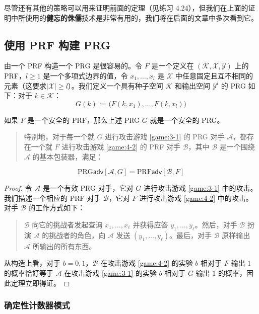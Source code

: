 尽管还有其他的策略可以用来证明前面的定理（见练习 4.24），但我们在上面的证明中所使用的\textbf{健忘的侏儒}技术是非常有用的，我们将在后面的文章中多次看到它。

\subsection{使用 PRF 构建 PRG}\label{subsec:4-4-4}

由一个 PRF 构造一个 PRG 是很容易的。令 $F$ 是一个定义在 $(\mathcal{K},\mathcal{X},\mathcal{Y})$ 上的 PRF，$l\geq1$ 是一个多项式边界的值，令 $x_1,\dots,x_l$ 是 $\mathcal{X}$ 中任意固定且互不相同的元素（这要求$|\mathcal{X}|\geq l$）。我们定义一个具有种子空间 $\mathcal{K}$ 和输出空间 $\mathcal{Y}^l$ 的 PRG 如下：对于 $k\in\mathcal{K}$：
\[
G(k):=
\big(
F(k,x_1),\dots,F(k,x_l)
\big)
\]

\begin{theorem}\label{theo:4-8}
如果 $F$ 是一个安全的 PRF，那么上述 PRG $G$ 就是一个安全的 PRG。
\begin{quote}
特别地，对于每一个就 $G$ 进行攻击游戏 \ref{game:3-1} 的 PRG 对手 $\mathcal{A}$，都存在一个就 $F$ 进行攻击游戏 \ref{game:4-2} 的 PRF 对手 $\mathcal{B}$，其中 $\mathcal{B}$ 是一个围绕 $\mathcal{A}$ 的基本包装器，满足：
\end{quote}
\[
\mathrm{PRG}\mathsf{adv}[\mathcal{A},G]= 
\mathrm{PRF}\mathsf{adv}[\mathcal{B},F]
\]
\end{theorem}

\begin{proof}
令 $\mathcal{A}$ 是一个有效 PRG 对手，它对 $G$ 进行攻击游戏 \ref{game:3-1} 中的攻击。我们描述一个相应的 PRF 对手 $\mathcal{B}$，它对 $F$ 进行攻击游戏 \ref{game:4-2} 中的攻击。对手 $\mathcal{B}$ 的工作方式如下：
\begin{quote}
$\mathcal{B}$ 向它的挑战者发起查询 $x_1,\dots,x_\ell$ 并获得应答 $y_1,\dots,y_\ell$。然后，对手 $\mathcal{B}$ 扮演 $\mathcal{A}$ 的挑战者的角色，向 $\mathcal{A}$ 发送 $(y_1,\dots,y_\ell)$。最后，对手 $\mathcal{B}$ 原样输出 $\mathcal{A}$ 所输出的所有东西。
\end{quote}

从构造上看，对于 $b=0,1$，$\mathcal{B}$ 在攻击游戏 \ref{game:4-2} 的实验 $b$ 相对于 $F$ 输出 $1$ 的概率恰好等于 $\mathcal{A}$ 在攻击游戏 \ref{game:3-1} 的实验 $b$ 相对于 $G$ 输出 $1$ 的概率，因此定理立即得证。
\end{proof}

\subsubsection{确定性计数器模式}

